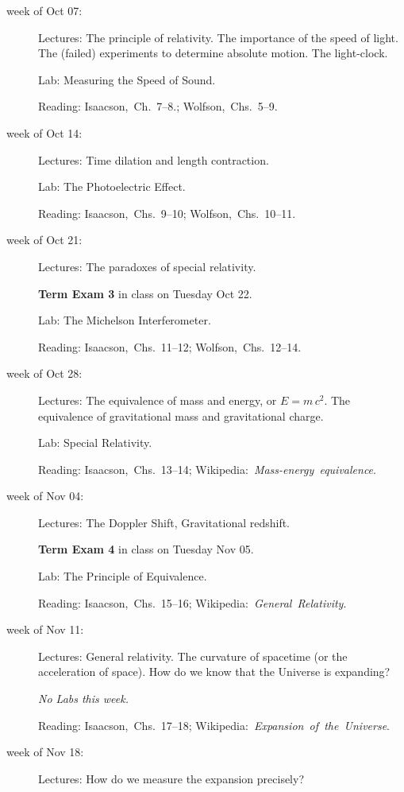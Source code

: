 \documentclass[12pt, letterpaper]{article}
\begin{document}
\begin{description}
\item[week of Oct 07:] Lectures: The principle of relativity. The
  importance of the speed of light. The (failed) experiments to
  determine absolute motion. The light-clock.

  Lab: Measuring the Speed of Sound.

  Reading:
  Isaacson,~Ch.~7--8.;
  Wolfson,~Chs.~5--9.

\item[week of Oct 14:] Lectures: Time dilation and length contraction.

  Lab: The Photoelectric Effect.

  Reading:
  Isaacson,~Chs.~9--10;
  Wolfson,~Chs.~10--11.

\item[week of Oct 21:] Lectures: The paradoxes of special relativity.

  \textbf{Term Exam 3} in class on Tuesday Oct 22.

  Lab: The Michelson Interferometer.

  Reading: Isaacson,~Chs.~11--12;
           Wolfson,~Chs.~12--14.

\item[week of Oct 28:] Lectures: The equivalence of mass and energy,
  or $E = m\,c^2$. The equivalence of gravitational mass and
  gravitational charge.

  Lab: Special Relativity.

  Reading: Isaacson,~Chs.~13--14;
  Wikipedia:~\textit{Mass-energy~equivalence}.

\item[week of Nov 04:] Lectures: The Doppler Shift, Gravitational redshift.

  \textbf{Term Exam 4} in class on Tuesday Nov 05.

  Lab: The Principle of Equivalence.

  Reading: Isaacson,~Chs.~15--16;
  Wikipedia:~\textit{General~Relativity}.

\item[week of Nov 11:] Lectures: General relativity. The curvature of
  spacetime (or the acceleration of space). How do we know that the Universe
  is expanding? 

  \textsl{No Labs this week.}

  Reading: Isaacson,~Chs.~17--18;
  Wikipedia:~\textit{Expansion~of~the~Universe}.

\item[week of Nov 18:] Lectures: How do we measure the expansion
  precisely?


\end{description}
\end{document}
